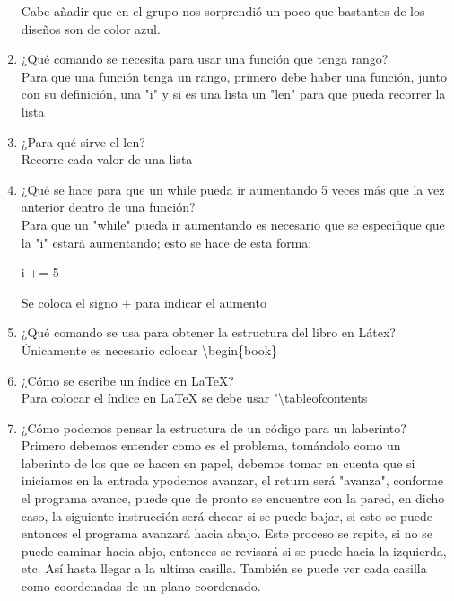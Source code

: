 \documentclass[letterpaper, 12pt, oneside]{article}%
\begin{document}
\begin{enumerate}
\begin{enumerate}
		\end{enumerate}
		Cabe añadir que en el grupo nos sorprendió un poco que bastantes de los diseños son de color azul.
		\item 
		¿Qué comando se necesita para usar una función que tenga rango?\\ 
		Para que una función tenga un rango, primero debe haber una función, junto con su definición, una "i" y si es una lista un "len" para que pueda recorrer la lista 
		\item 
		¿Para qué sirve el len?\\
		Recorre cada valor de una lista
		\item 
		¿Qué se hace para que un while pueda ir aumentando 5 veces más que la vez anterior dentro de una función?\\
		Para que un "while" pueda ir aumentando es necesario que se especifique que la "i" estará aumentando; esto se hace de esta forma:
		\begin{center}
			i += 5
		\end{center}
		Se coloca el signo + para indicar el aumento
		\item 
		¿Qué comando se usa para obtener la estructura del libro en Látex?\\
		Únicamente es necesario colocar \textbackslash begin\{book\}
		\item 
		¿Cómo se escribe un índice en LaTeX?\\
		Para colocar el índice en LaTeX se debe usar "\textbackslash tableofcontents
		\item 
		¿Cómo podemos pensar la estructura de un código para un laberinto?\\
		Primero debemos entender como es el problema, tomándolo como un laberinto de los que se hacen en papel, debemos tomar en cuenta que si iniciamos en la entrada ypodemos avanzar, el return será "avanza", conforme el programa avance, puede que de pronto se encuentre con la pared, en dicho caso, la siguiente instrucción será checar si se puede bajar, si esto se puede entonces el programa avanzará hacia abajo. 
		Este proceso se repite, si no se puede caminar hacia abjo, entonces se revisará si se puede hacia la izquierda, etc.
		Así hasta llegar a la ultima casilla. También se puede ver cada casilla como coordenadas de un plano coordenado.  
	\end{enumerate}
\end{document}
